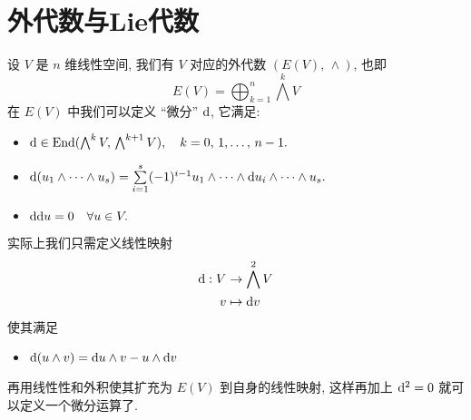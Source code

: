 \section{外代数与Lie代数}
    设 $V$ 是 $n$ 维线性空间, 我们有 $V$ 对应的外代数 $(E(V),\,\wedge)$, 也即
    \begin{equation*}
        E(V) = \bigoplus_{k=1}^{n}\bigwedge^{k}V
    \end{equation*}
    在 $E(V)$ 中我们可以定义 “微分” ${\rm d}$, 它满足:
    \begin{itemize}
        \item ${\rm d}\in{\rm End}(\bigwedge^{k}V,\,\bigwedge^{k+1}V),\quad k=0,\,1,\dots,\,n-1.$
        \item ${\rm d}(u_1\wedge\cdots\wedge u_s) = \sum\limits_{i = 1}^{s}(-1)^{i-1}u_1\wedge\cdots\wedge {\rm d} u_i\wedge\cdots\wedge u_s.$
        \item ${\rm d}{\rm d} u = 0\quad \forall u\in V.$
    \end{itemize}
    实际上我们只需定义线性映射
    \begin{align*}
        {\rm d}:V&\rightarrow\bigwedge^2V\\
        v&\mapsto{\rm d} v
    \end{align*}
    使其满足
    \begin{itemize}
        \item ${\rm d}(u\wedge v) = {\rm d} u\wedge v-u\wedge{\rm d} v$
    \end{itemize}
    再用线性性和外积使其扩充为 $E(V)$ 到自身的线性映射, 这样再加上 ${\rm d}^2 = 0$ 就可以定义一个微分运算了.


